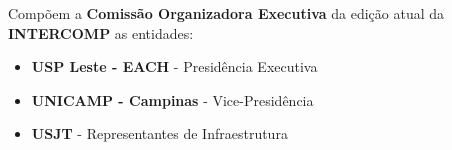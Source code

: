 
\begin{article}
	\label{art:comissao}
	Compõem a \textbf{Comissão Organizadora Executiva} da edição atual da \textbf{INTERCOMP} as entidades:
	\begin{itemize}[noitemsep]
		\item \textbf{USP Leste - EACH} - Presidência Executiva
		\item \textbf{UNICAMP - Campinas} - Vice-Presidência
		\item \textbf{USJT} - Representantes de Infraestrutura
	\end{itemize}
\end{article}
